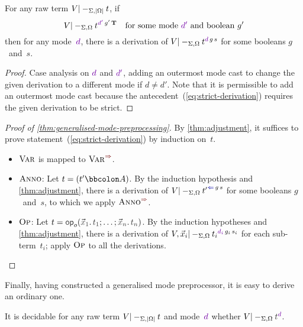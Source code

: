 \begin{lemma}\label{thm:adjustment}
For any raw term $V |-_{\Sigma,\left|\Omega\right|} t$, if
\begin{equation}\label{eq:strict-derivation}
V |-_{\Sigma,\Omega} t^{\dir{d'}\,g'\,\True} \quad\text{for some mode~$\dir{d'}$ and boolean~$g'$}
\end{equation}
then for any mode~$\dir{d}$, there is a derivation of\/ $V |-_{\Sigma,\Omega} t^{\dir{d}\,g\,s}$ for some booleans $g$~and~$s$.
\end{lemma}

\begin{proof}
Case analysis on $\dir{d}$ and $\dir{d'}$, adding an outermost mode cast to change the given derivation to a different mode if $d \neq d'$.
Note that it is permissible to add an outermost mode cast because the antecedent~(\ref{eq:strict-derivation}) requires the given derivation to be strict.
\end{proof}



\begin{proof}[Proof of \cref{thm:generalised-mode-preprocessing}]
By \cref{thm:adjustment}, it suffices to prove statement~(\ref{eq:strict-derivation}) by induction on~$t$.

\begin{itemize}
\item $\textnormal{\textsc{Var}}$ is mapped to $\SynRule{Var}$.
\item $\textnormal{\textsc{Anno}}$:
Let $t = (t' \bbcolon A)$.
By the induction hypothesis and \cref{thm:adjustment}, there is a derivation of $V |-_{\Sigma,\Omega} {t'}^{\chk\,g\,s}$ for some booleans $g$~and~$s$, to which we apply $\SynRule{Anno}$.
\item $\textnormal{\textsc{Op}}$:
Let $t = \tmOpts$.
By the induction hypotheses and \cref{thm:adjustment}, there is a derivation of $V, \vec x_i |-_{\Sigma,\Omega} {t_i}^{\dir{d_i}\,g_i\,s_i}$ for each sub-term~$t_i$; apply $\textnormal{\textsc{Op}}$ to all the derivations.
\vspace{-\topsep-\baselineskip}
\end{itemize}
\end{proof}

Finally, having constructed a generalised mode preprocessor, it is easy to derive an ordinary one.

\begin{corollary}\label{thm:mode-preprocessing}
  It is decidable for any raw term $V |-_{\Sigma,\left|\Omega\right|} t$ and mode~$\dir{d}$ whether $V |-_{\Sigma,\Omega} \isTerm{t}^\dir{d}$.
\end{corollary}

